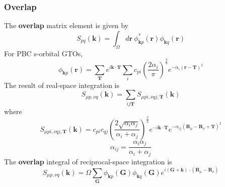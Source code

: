 \documentclass{article}
\begin{document}
        \subsubsection{Overlap}
            The \textbf{overlap} matrix element\cite{McClain2017} is given by
            \begin{equation}
                S_{pq}(\textbf{k}) = \int_{\Omega}d\textbf{r}\ \phi_{\textbf{k}p}^*(\textbf{r})\phi_{\textbf{k}q}(\textbf{r})
            \end{equation}
            For PBC s-orbital GTOs,
            $$ \phi_{\textbf{k}p}(\textbf{r}) = \sum_{\textbf{T}}e^{i\textbf{k}\cdot\textbf{T}}\sum_ic_{pi}\left(\frac{2\alpha_i}{\pi}\right)^{\frac{3}{4}}
                e^{-\alpha_i(\textbf{r}-\textbf{T})^2} $$
            The result of real-space integration is
            \begin{equation}
                S_{\mu p,\nu q}(\textbf{k}) = \sum_{ij\textbf{T}}S_{\mu pi,\nu qj,\textbf{T}}(\textbf{k})
            \end{equation}
            where
            \begin{equation}
                S_{\mu pi,\nu qj,\textbf{T}}(\textbf{k}) = c_{pi}c_{qj}(\frac{2\sqrt{\alpha_i\alpha_j}}{\alpha_i+\alpha_j})^{\frac{3}{2}}
                e^{-i\textbf{k}\cdot\textbf{T}}e^{-\alpha_{ij}(\textbf{R}_{\mu}-\textbf{R}_{\nu}+\textbf{T})^2}
            \end{equation}
            $$\alpha_{ij} = \frac{\alpha_i\alpha_j}{\alpha_i+\alpha_j}$$
            The \textbf{overlap} integral of reciprocal-space integration is
            \begin{equation}
                S_{\mu p,\nu q}(\textbf{k}) = \Omega\sum_{\textbf{G}}\phi_{\textbf{k}p}(\textbf{G})\phi_{\textbf{k}q}(\textbf{G})
                e^{i(\textbf{G}+\textbf{k})\cdot(\textbf{R}_{\mu}-\textbf{R}_{\nu})}
            \end{equation}
\end{document}
